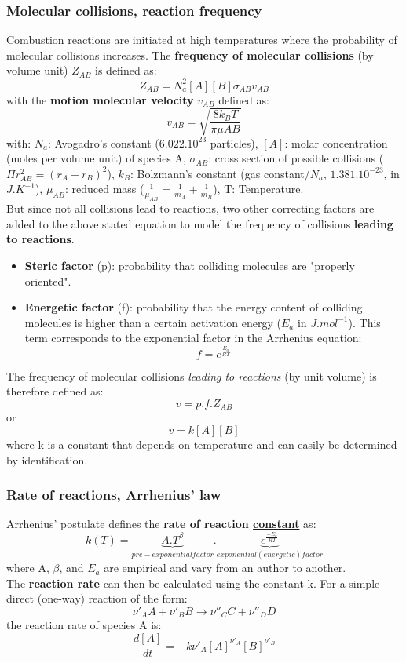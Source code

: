 \documentclass[a4paper,11pt]{article}
\begin{document}
\subsubsection{Molecular collisions, reaction frequency}
Combustion reactions are initiated at high temperatures where the probability of molecular collisions increases. The \textbf{frequency of molecular collisions} (by volume unit) $Z_{AB}$ is defined as:
\[Z_{AB} = N_a^2 [A] [B] \sigma_{AB} v_{AB}\]
with the \textbf{motion molecular velocity} $v_{AB}$ defined as:
\[v_{AB}=\sqrt{\frac{8k_B T}{\pi \mu{AB}}}\]
with: $N_{a}$: Avogadro's constant ($6.022.10^{23}$ particles), $[A]$: molar concentration (moles per volume unit) of species A, $\sigma_{AB}$: cross section of possible collisions ($\Pi r_{AB}^2=(r_A+r_B)^2$), $k_B$: Bolzmann's constant (gas constant/$N_a$, $1.381.10^{-23}$, in $J.K^{-1}$), $\mu_{AB}$: reduced mass ($\frac{1}{\mu_{AB}}=\frac{1}{m_A}+\frac{1}{m_B}$), T: Temperature.\\
But since not all collisions lead to reactions, two other correcting factors are added to the above stated equation to model the frequency of collisions \textbf{leading to reactions}.
\begin{itemize}
\item \textbf{Steric factor} (p): probability that colliding molecules are "properly oriented".
\item \textbf{Energetic factor} (f): probability that the energy content of colliding molecules is higher than a certain activation energy ($E_a$ in $J.mol^{-1}$). This term corresponds to the exponential factor in the Arrhenius equation:
\[f=e^\frac{E_a}{RT}\]
\end{itemize}
The frequency of molecular collisions \emph{leading to reactions} (by unit volume) is therefore defined as:
\[v = p.f.Z_{AB}\]
or
\[v = k[A][B]\]
where k is a constant that depends on temperature and can easily be determined by identification.
\subsubsection{Rate of reactions, Arrhenius' law}
Arrhenius' postulate defines the \textbf{rate of reaction \underline{constant}} as:
\[k(T) = \underbrace{A.T^\beta}_{pre-exponential factor}.\underbrace{e^\frac{-E_a}{RT}}_{exponential (energetic) factor}\]
where A, $\beta$, and $E_a$ are empirical and vary from an author to another.\\
The \textbf{reaction rate} can then be calculated using the constant k. For a simple direct (one-way) reaction of the form:
\[\nu'_A A + \nu'_B B \rightarrow \nu''_C C + \nu''_D D\]
the reaction rate of species A is:
\[\frac{d[A]}{dt} = - k \nu'_A [A]^{\nu'_A} [B]^{\nu'_B}\]
\end{document}
